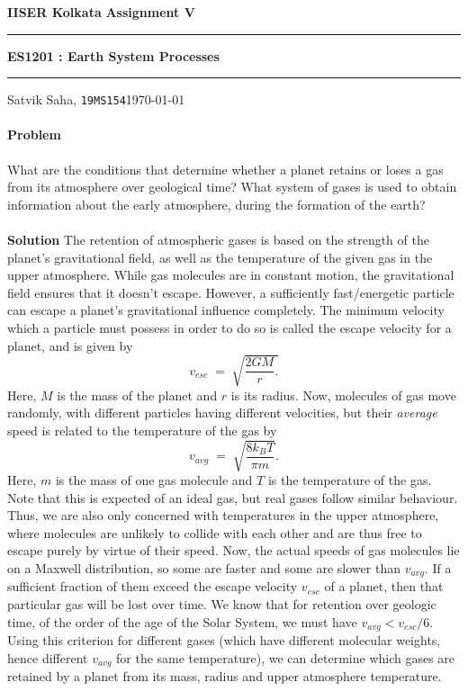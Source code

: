 \documentclass[10pt]{article}
\newcounter{prob}
\def\problem{\stepcounter{prob}\paragraph{Problem \arabic{prob}}}
\def\solution{\\\\\textbf{Solution }}
\begin{document}
        \par\textbf{IISER Kolkata} \hfill \textbf{Assignment V}
        \vspace{3pt}
        \hrule
        \vspace{3pt}
        \begin{center}
                \LARGE{\textbf{ES1201 : Earth System Processes}}
        \end{center}
        \vspace{3pt}
        \hrule
        \vspace{3pt}
        Satvik Saha, \texttt{19MS154}\hfill\today
        \vspace{20pt}

        \problem What are the conditions that determine whether a planet retains or loses a gas from its atmosphere over geological time?
        What system of gases is used to obtain information about the early atmosphere, during the formation of the earth?
        \solution The retention of atmospheric gases is based on the strength of the planet's gravitational field, as well as the temperature
        of the given gas in the upper atmosphere. While gas molecules are in constant motion, the gravitational field ensures that it doesn't
        escape. However, a sufficiently fast/energetic particle can escape a planet's gravitational influence completely. The minimum
        velocity which a particle must possess in order to do so is called the escape velocity for a planet, and is given by
        \[
                v_{esc} \;=\; \sqrt{\frac{2GM}{r}.}
        \]
        Here, $M$ is the mass of the planet and $r$ is its radius. Now, molecules of gas move randomly, with different particles
        having different velocities, but their \textit{average} speed is related to the temperature of the gas by
        \[
                v_{avg} \;=\; \sqrt{\frac{8k_BT}{\pi m}}.
        \]
        Here, $m$ is the mass of one gas molecule and $T$ is the temperature of the gas. Note that this is expected of an ideal gas,
        but real gases follow similar behaviour. Thus, we are also only concerned with temperatures in the upper atmosphere, where
        molecules are unlikely to collide with each other and are thus free to escape purely by virtue of their speed.
        Now, the actual speeds of gas molecules lie on a Maxwell distribution, so some are faster
        and some are slower than $v_{avg}$. If a sufficient fraction of them exceed the escape velocity $v_{esc}$ of a planet,
        then that particular gas will be lost over time. We know that for retention over geologic time, of the order of the age of the Solar System,
        we must have $v_{avg} < v_{esc} /6$. Using this criterion for different gases (which have different molecular weights, hence different
        $v_{avg}$ for the same temperature), we can determine which gases are retained by a planet from its mass, radius and
        upper atmosphere temperature. \\
\end{document}
